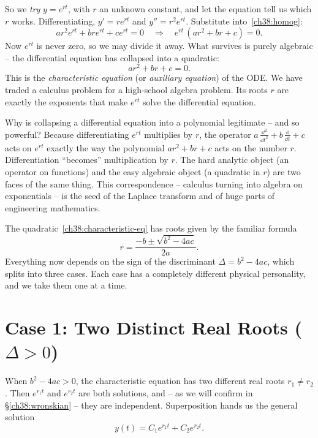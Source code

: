 So we \emph{try} $y = e^{rt}$, with $r$ an unknown constant, and let the equation
tell us which $r$ works. Differentiating, $y' = r e^{rt}$ and $y'' = r^2 e^{rt}$.
Substitute into~\eqref{ch38:homog}:
\[
  a r^2 e^{rt} + b r e^{rt} + c e^{rt} = 0
  \quad\Longrightarrow\quad
  e^{rt}\,(a r^2 + b r + c) = 0.
\]
Now $e^{rt}$ is never zero, so we may divide it away. What survives is purely
algebraic -- the differential equation has collapsed into a quadratic:
\begin{equation}
  \boxed{\,a r^2 + b r + c = 0.\,}
  \label{ch38:characteristic-eq}
\end{equation}
This is the \emph{characteristic equation} (or \emph{auxiliary equation}) of the
ODE. We have traded a calculus problem for a high-school algebra problem. Its
roots $r$ are exactly the exponents that make $e^{rt}$ solve the differential
equation.

\begin{whybox}
Why is collapsing a differential equation into a polynomial legitimate -- and so
powerful? Because differentiating $e^{rt}$ multiplies by $r$, the operator
$a\,\frac{\dd^2}{\dd t^2} + b\,\frac{\dd}{\dd t} + c$ acts on $e^{rt}$ exactly the
way the polynomial $a r^2 + b r + c$ acts on the number $r$. Differentiation
``becomes'' multiplication by $r$. The hard analytic object (an operator on
functions) and the easy algebraic object (a quadratic in $r$) are two faces of
the same thing. This correspondence -- calculus turning into algebra on
exponentials -- is the seed of the Laplace transform and of huge parts of
engineering mathematics.
\end{whybox}

The quadratic~\eqref{ch38:characteristic-eq} has roots given by the familiar
formula
\[
  r = \frac{-b \pm \sqrt{b^2 - 4ac}}{2a}.
\]
Everything now depends on the sign of the discriminant $\Delta = b^2 - 4ac$,
which splits into three cases. Each case has a completely different physical
personality, and we take them one at a time.

\section{Case 1: Two Distinct Real Roots ($\Delta > 0$)}
\label{ch38:real-roots}

When $b^2 - 4ac > 0$, the characteristic equation has two different real roots
$r_1 \neq r_2$. Then $e^{r_1 t}$ and $e^{r_2 t}$ are both solutions, and -- as we
will confirm in \S\ref{ch38:wronskian} -- they are independent. Superposition
hands us the general solution
\begin{equation}
  y(t) = C_1 e^{r_1 t} + C_2 e^{r_2 t}.
  \label{ch38:real-general}
\end{equation}

